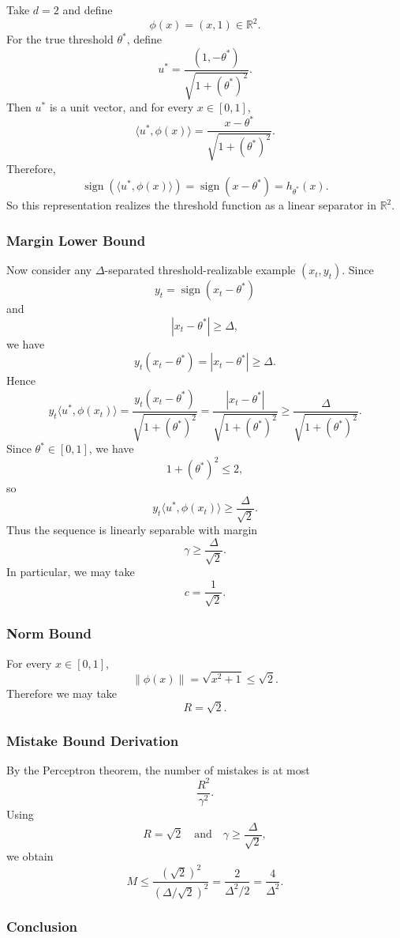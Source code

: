 \documentclass{article}
\begin{document}
Take $d=2$ and define
$$
\phi(x) = (x,1) \in \mathbb{R}^2.
$$
For the true threshold $\theta^*$, define
$$
u^* = \frac{(1,-\theta^*)}{\sqrt{1+(\theta^*)^2}}.
$$
Then $u^*$ is a unit vector, and for every $x \in [0,1]$,
$$
\langle u^*, \phi(x) \rangle
= \frac{x-\theta^*}{\sqrt{1+(\theta^*)^2}}.
$$
Therefore,
$$
\operatorname{sign}(\langle u^*, \phi(x) \rangle)
= \operatorname{sign}(x-\theta^*)
= h_{\theta^*}(x).
$$
So this representation realizes the threshold function as a linear separator in $\mathbb{R}^2$.

\subsubsection{Margin Lower Bound}

Now consider any $\Delta$-separated threshold-realizable example $(x_t,y_t)$. Since
$$
y_t = \operatorname{sign}(x_t-\theta^*)
$$
and
$$
|x_t-\theta^*| \geq \Delta,
$$
we have
$$
y_t (x_t-\theta^*) = |x_t-\theta^*| \geq \Delta.
$$
Hence
$$
y_t \langle u^*, \phi(x_t) \rangle
= \frac{y_t (x_t-\theta^*)}{\sqrt{1+(\theta^*)^2}}
= \frac{|x_t-\theta^*|}{\sqrt{1+(\theta^*)^2}}
\geq \frac{\Delta}{\sqrt{1+(\theta^*)^2}}.
$$
Since $\theta^* \in [0,1]$, we have
$$
1+(\theta^*)^2 \leq 2,
$$
so
$$
y_t \langle u^*, \phi(x_t) \rangle \geq \frac{\Delta}{\sqrt{2}}.
$$
Thus the sequence is linearly separable with margin
$$
\gamma \geq \frac{\Delta}{\sqrt{2}}.
$$
In particular, we may take
$$
c = \frac{1}{\sqrt{2}}.
$$

\subsubsection{Norm Bound}

For every $x \in [0,1]$,
$$
\|\phi(x)\|
= \sqrt{x^2+1}
\leq \sqrt{2}.
$$
Therefore we may take
$$
R = \sqrt{2}.
$$

\subsubsection{Mistake Bound Derivation}

By the Perceptron theorem, the number of mistakes is at most
$$
\frac{R^2}{\gamma^2}.
$$
Using
$$
R = \sqrt{2}
\quad \text{and} \quad
\gamma \geq \frac{\Delta}{\sqrt{2}},
$$
we obtain
$$
M \leq \frac{(\sqrt{2})^2}{(\Delta/\sqrt{2})^2}
= \frac{2}{\Delta^2/2}
= \frac{4}{\Delta^2}.
$$

\subsubsection{Conclusion}
\end{document}
